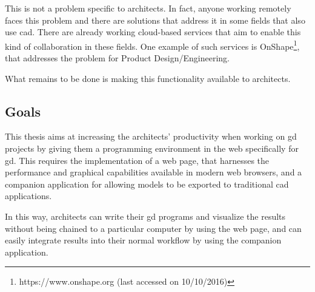 This is not a problem specific to architects.
In fact, anyone working remotely faces this problem and there are solutions that address it in some fields that also use \gls{cad}.
There are already working cloud-based services that aim to enable this kind of collaboration in these fields.
One example of such services is OnShape\footnote{https://www.onshape.org (last accessed on 10/10/2016)}, that addresses the problem for Product Design/Engineering.

What remains to be done is making this functionality available to architects.


\subsection{Goals}
This thesis aims at increasing the architects' productivity when working on \gls{gd} projects by giving them a programming environment in the web specifically for \gls{gd}.
This requires the implementation of a web page, that harnesses the performance and graphical capabilities available in modern web browsers, and a companion application for allowing models to be exported to traditional \gls{cad} applications.

In this way, architects can write their \gls{gd} programs and visualize the results without being chained to a particular computer by using the web page, and can easily integrate results into their normal workflow by using the companion application.


